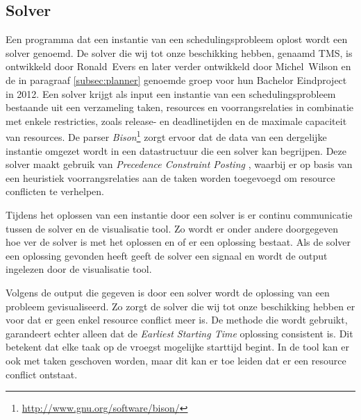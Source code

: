 \subsection{Solver}
\label{subsec:solver}
Een programma dat een instantie van een schedulingsprobleem oplost wordt een solver genoemd. De solver die wij tot onze beschikking hebben, genaamd TMS, is ontwikkeld door \mbox{Ronald Evers} \cite{ronaldevers2010} en later verder ontwikkeld door \mbox{Michel Wilson} en de in paragraaf \ref{subsec:planner} genoemde groep voor hun Bachelor Eindproject in 2012. Een solver krijgt als input een instantie van een schedulingsprobleem bestaande uit een verzameling taken, resources en voorrangsrelaties in combinatie met enkele restricties, zoals release- en deadlinetijden en de maximale capaciteit van resources. De parser \emph{Bison}\footnote{\url{http://www.gnu.org/software/bison/}} zorgt ervoor dat de data van een dergelijke instantie omgezet wordt in een datastructuur die een solver kan begrijpen. Deze solver maakt gebruik van \emph{Precedence Constraint Posting} \cite{seminarium2014}, waarbij er op basis van een heuristiek voorrangsrelaties aan de taken worden toegevoegd om resource conflicten te verhelpen.

Tijdens het oplossen van een instantie door een solver is er continu communicatie tussen de solver en de visualisatie tool. Zo wordt er onder andere doorgegeven hoe ver de solver is met het oplossen en of er een oplossing bestaat. Als de solver een oplossing gevonden heeft geeft de solver een signaal en wordt de output ingelezen door de visualisatie tool. 

Volgens de output die gegeven is door een solver wordt de oplossing van een probleem gevisualiseerd. Zo zorgt de solver die wij tot onze beschikking hebben er voor dat er geen enkel resource conflict meer is. De methode die wordt gebruikt, garandeert echter alleen dat de \emph{Earliest Starting Time} oplossing consistent is. Dit betekent dat elke taak op de vroegst mogelijke starttijd begint. In de tool kan er ook met taken geschoven worden, maar dit kan er toe leiden dat er een resource conflict ontstaat.